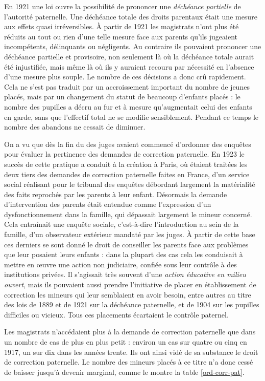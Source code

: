 { En 1921 une loi ouvre la possibilité de prononcer une \emph{déchéance partielle} de l'autorité paternelle. Une déchéance totale des droits parentaux était une mesure aux effets quasi irréversibles. À partir de 1921 les magistrats n'ont plus été réduits au tout ou rien d'une telle mesure face aux parents qu'ils jugeaient incompétents, délinquants ou négligents. Au contraire ils pouvaient prononcer une déchéance partielle et provisoire, non seulement là où la déchéance totale aurait été injustifiée, mais même là où ils y auraient recouru par nécessité en l'absence d'une mesure plus souple. Le nombre de ces décisions a donc crû rapidement. Cela ne s'est pas traduit par un accroissement important du nombre de jeunes placés, mais par un changement du statut de beaucoup d'enfants placés : le nombre des pupilles a décru au fur et à mesure qu'augmentait celui des enfants en garde, sans que l'effectif total ne se modifie sensiblement. Pendant ce temps le nombre des abandons ne cessait de diminuer.

 On a vu que dès la fin du  des juges avaient commencé d'ordonner des enquêtes pour évaluer la pertinence des demandes de correction paternelle. En 1923 le succès de cette pratique a conduit à la création à Paris, où étaient traitées les deux tiers des demandes de correction paternelle faites en France, d'un service social réalisant pour le tribunal des enquêtes débordant largement la matérialité des faits reprochés par les parents à leur enfant. Désormais la demande d'intervention des parents était entendue comme l'expression d'un dysfonctionnement dans la famille, qui dépassait largement le mineur concerné. Cela entraînait une enquête sociale, c'est-à-dire l'introduction au sein de la famille, d'un observateur extérieur mandaté par les juges. À partir de cette base ces derniers se sont donné le droit de conseiller les parents face aux problèmes que leur posaient leurs enfants : dans la plupart des cas cela les conduisait à mettre en œuvre une action non judiciaire, confiée sous leur contrôle à des institutions privées. Il s'agissait très souvent d'une \emph{action éducative en milieu ouvert}, mais ils pouvaient aussi prendre l'initiative de placer en établissement de correction les mineurs qui leur semblaient en avoir besoin, entre autres au titre des lois de 1889 et de 1921 sur la déchéance paternelle, et de 1904 sur les pupilles difficiles ou vicieux. Tous ces placements écartaient le contrôle paternel.

 Les magistrats n'accédaient plus à la demande de correction paternelle que dans un nombre de cas de plus en plus petit : environ un cas sur quatre ou cinq en 1917, un sur dix dans les années trente. Ils ont ainsi vidé de sa substance le droit de correction paternelle. Le nombre des mineurs placés à ce titre n'a donc cessé de baisser jusqu'à devenir marginal, comme le montre la table \vref{ord-corr-pat}.
 
}
